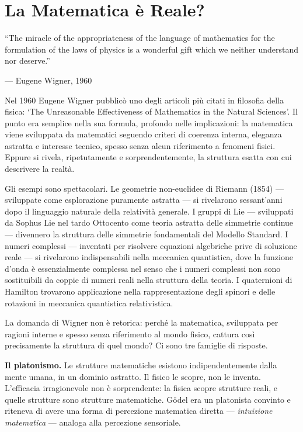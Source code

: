 \documentclass[12pt,a4paper,openany]{book}
\newcommand{\sezione}[1]{\vspace{1.2em}{\large\bfseries #1}\vspace{0.5em}\par}
\begin{document}
\chapter{La Matematica è Reale?}

\epigraph{``The miracle of the appropriateness of the language of mathematics for the formulation of the laws of physics is a wonderful gift which we neither understand nor deserve.''}{--- Eugene Wigner, 1960}

\sezione{L'efficacia irragionevole}

Nel 1960 Eugene Wigner pubblicò uno degli articoli più citati in filosofia della fisica: `The Unreasonable Effectiveness of Mathematics in the Natural Sciences'. Il punto era semplice nella sua formula, profondo nelle implicazioni: la matematica viene sviluppata da matematici seguendo criteri di coerenza interna, eleganza astratta e interesse tecnico, spesso senza alcun riferimento a fenomeni fisici. Eppure si rivela, ripetutamente e sorprendentemente, la struttura esatta con cui descrivere la realtà.

Gli esempi sono spettacolari. Le geometrie non-euclidee di Riemann (1854) — sviluppate come esplorazione puramente astratta — si rivelarono sessant'anni dopo il linguaggio naturale della relatività generale. I gruppi di Lie — sviluppati da Sophus Lie nel tardo Ottocento come teoria astratta delle simmetrie continue — divennero la struttura delle simmetrie fondamentali del Modello Standard. I numeri complessi — inventati per risolvere equazioni algebriche prive di soluzione reale — si rivelarono indispensabili nella meccanica quantistica, dove la funzione d'onda è essenzialmente complessa nel senso che i numeri complessi non sono sostituibili da coppie di numeri reali nella struttura della teoria. I quaternioni di Hamilton trovarono applicazione nella rappresentazione degli spinori e delle rotazioni in meccanica quantistica relativistica.

La domanda di Wigner non è retorica: perché la matematica, sviluppata per ragioni interne e spesso senza riferimento al mondo fisico, cattura così precisamente la struttura di quel mondo? Ci sono tre famiglie di risposte.

\sezione{Tre risposte al problema di Wigner}

\textbf{Il platonismo.} Le strutture matematiche esistono indipendentemente dalla mente umana, in un dominio astratto. Il fisico le scopre, non le inventa. L'efficacia irragionevole non è sorprendente: la fisica scopre strutture reali, e quelle strutture sono strutture matematiche. Gödel era un platonista convinto e riteneva di avere una forma di percezione matematica diretta — \textit{intuizione matematica} — analoga alla percezione sensoriale.
\end{document}
